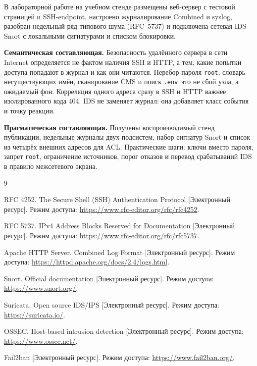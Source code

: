 
В лабораторной работе на учебном стенде размещены веб-сервер с тестовой страницей и SSH-endpoint, настроено журналирование Combined и syslog, разобран недельный ряд типового шума (RFC~5737) и подключена сетевая IDS Snort с локальными сигнатурами и списком блокировки.

\textbf{Семантическая составляющая.} Безопасность удалённого сервера в сети Internet определяется не фактом наличия SSH и HTTP, а тем, какие попытки доступа попадают в журнал и как они читаются. Перебор пароля \texttt{root}, словарь несуществующих имён, сканирование CMS и поиск \texttt{.env}~\mdash  это не сбой узла, а ожидаемый фон. Корреляция одного адреса сразу в SSH и HTTP важнее изолированного кода 404. IDS не заменяет журнал: она добавляет класс события и точку реакции.

\textbf{Прагматическая составляющая.} Получены воспроизводимый стенд публикации, недельные журналы двух подсистем, набор сигнатур Snort и список из четырёх внешних адресов для ACL. Практические шаги: ключи вместо пароля, запрет \texttt{root}, ограничение источников, порог отказов и перевод срабатываний IDS в правило межсетевого экрана.

\begin{thebibliography}{9}

	RFC 4252. The Secure Shell (SSH) Authentication Protocol [Электронный ресурс]. \mdash  Режим доступа: \url{https://www.rfc-editor.org/rfc/rfc4252}.

	RFC 5737. IPv4 Address Blocks Reserved for Documentation [Электронный ресурс]. \mdash  Режим доступа: \url{https://www.rfc-editor.org/rfc/rfc5737}.

	Apache HTTP Server. Combined Log Format [Электронный ресурс]. \mdash  Режим доступа: \url{https://httpd.apache.org/docs/2.4/logs.html}.

	Snort. Official documentation [Электронный ресурс]. \mdash  Режим доступа: \url{https://www.snort.org/}.

	Suricata. Open source IDS/IPS [Электронный ресурс]. \mdash  Режим доступа: \url{https://suricata.io/}.

	OSSEC. Host-based intrusion detection [Электронный ресурс]. \mdash  Режим доступа: \url{https://www.ossec.net/}.

	Fail2ban [Электронный ресурс]. \mdash  Режим доступа: \url{https://www.fail2ban.org/}.
\end{thebibliography}
